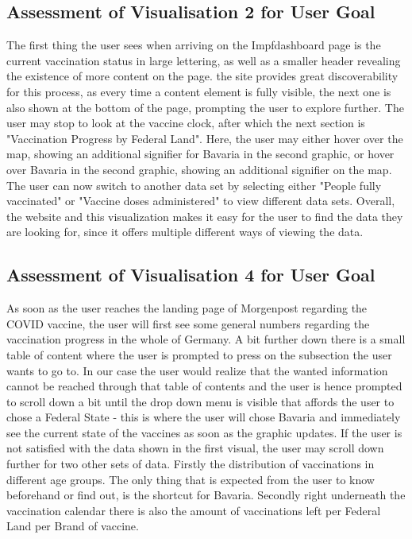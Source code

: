 \documentclass[12pt, letterpaper]{article}
\begin{document}
\subsection{Assessment of Visualisation 2 for User Goal}
The first thing the user sees when arriving on the Impfdashboard page is the current vaccination status in large lettering, as well as a smaller header revealing the existence of more content on the page. the site provides great discoverability for this process, as every time a content element is fully visible, the next one is also shown at the bottom of the page, prompting the user to explore further. The user may stop to look at the vaccine clock, after which the next section is "Vaccination Progress by Federal Land". Here, the user may either hover over the map, showing an additional signifier for Bavaria in the second graphic, or hover over Bavaria in the second graphic, showing an additional signifier on the map. The user can now switch to another data set by selecting either "People fully vaccinated" or "Vaccine doses administered" to view different data sets. Overall, the website and this visualization makes it easy for the user to find the data they are looking for, since it offers multiple different ways of viewing the data.

\subsection{Assessment of Visualisation 4 for User Goal}
As soon as the user reaches the landing page of Morgenpost regarding the COVID vaccine, the user will first see some general numbers regarding the vaccination progress in the whole of Germany. A bit further down there is a small table of content where the user is prompted to press on the subsection the user wants to go to. In our case the user would realize that the wanted information cannot be reached through that table of contents and the user is hence prompted to scroll down a bit until the drop down menu is visible that affords the user to chose a Federal State - this is where the user will chose Bavaria and immediately see the current state of the vaccines as soon as the graphic updates. If the user is not satisfied with the data shown in the first visual, the user may scroll down further for two other sets of data. Firstly the distribution of vaccinations in different age groups. The only thing that is expected from the user to know beforehand or find out, is the shortcut for Bavaria. Secondly right underneath the vaccination calendar there is also the amount of vaccinations left per Federal Land per Brand of vaccine.
\newpage
\end{document}
